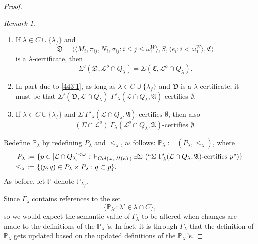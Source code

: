 \documentclass[12pt, twoside]{memoir}
\numberwithin{equation}{section}
\theoremstyle{definition}
\theoremstyle{remark}
\newtheorem{rem}[thm]{Remark}
\theoremstyle{definition}
\theoremstyle{definition}
\theoremstyle{definition}
\theoremstyle{remark}
\begin{document}
\begin{proof}
\begin{rem}\label{rem443}
\leavevmode
\begin{enumerate}[label=(\arabic*)]
    \item\label{443'1} If $\lambda \in C \cup \{\lambda_f\}$ and
    \begin{equation*}
        \mathfrak{D} = \langle \langle \bar{M}_i, \pi_{ij},  \bar{N}_i, \sigma_{ij} : i \leq j \leq \omega_1^{W} \rangle, S, \langle e_i : i < \omega_1^W \rangle, \mathfrak{C} \rangle
    \end{equation*}
    is a $\lambda$-certificate, then
    \begin{equation*}
        \Sigma'(\mathfrak{D}, \mathcal{L}^o \cap Q_{\lambda}) = \Sigma(\mathfrak{C}, \mathcal{L}^o \cap Q_{\lambda}) \text{.}
    \end{equation*}
    \item\label{443'2} In part due to \ref{443'1}, as long as $\lambda \in C \cup \{\lambda_f\}$ and $\mathfrak{D}$ is a $\lambda$-certificate, it must be that $\Sigma'(\mathfrak{D}, \mathcal{L} \cap Q_{\lambda})$ $\Gamma'_{\lambda} (\mathcal{L} \cap Q_{\lambda}, \mathfrak{A})$-certifies $\emptyset$.
    \item\label{443'3} If $\lambda \in C \cup \{\lambda_f\}$ and $\Sigma \ \Gamma'_{\lambda} (\mathcal{L} \cap Q_{\lambda}, \mathfrak{A}) \text{-certifies } \emptyset$, then also
    \begin{equation*}
        (\Sigma \cap \mathcal{L}^o) \ \Gamma_{\lambda} (\mathcal{L}^o \cap Q_{\lambda}, \mathfrak{A}) \text{-certifies } \emptyset \text{.}
    \end{equation*}
\end{enumerate}
\end{rem}

Redefine $\mathbb{P}_{\lambda}$ by redefining $P_{\lambda}$ and $\leq_{\lambda}$, as follows: $\mathbb{P}_{\lambda} := (P_{\lambda}, \leq_{\lambda})$, where
\begin{align*}
    P_{\lambda} := \ & \{p \in [\mathcal{L} \cap Q_{\lambda}]^{< \omega} : \ \Vdash_{Col(\omega, |H(\kappa)|)} \exists \Sigma \ (``\Sigma \ \Gamma'_{\lambda} (\mathcal{L} \cap Q_{\lambda}, \mathfrak{A}) \text{-certifies } p")\} \\
    \leq_{\lambda} \ := \ & \{(p, q) \in P_{\lambda} \times P_{\lambda} : q \subset p\} \text{.}
\end{align*}
As before, let $\mathbb{P}$ denote $\mathbb{P}_{\lambda_f}$. 

Since $\Gamma_{\lambda}$ contains references to the set 
\begin{equation*}
    \{\mathbb{P}_{\lambda'} : \lambda' \in \lambda \cap C\} \text{,}
\end{equation*}
so we would expect the semantic value of $\Gamma_{\lambda}$ to be altered when changes are made to the definitions of the $\mathbb{P}_{\lambda'}$'s. In fact, it is through $\Gamma_{\lambda}$ that the definition of $\mathbb{P}_{\lambda}$ gets updated based on the updated definitions of the $\mathbb{P}_{\lambda'}$'s.


\end{proof}
\end{document}
